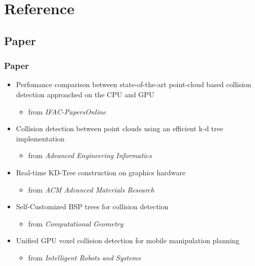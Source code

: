 \documentclass{beamer}
\begin{document}
\section{Reference}

\subsection{Paper}
	\begin{frame}
	\frametitle{Paper}
	\begin{itemize}
		\item Perfomance comparison between state-of-the-art point-cloud based collision detection approached on the CPU and GPU
			\begin{itemize}
				\item from \it{IFAC-PapersOnline}
			\end{itemize}
		\item Collision detection between point clouds using an efficient k-d tree implementation
			\begin{itemize}
				\item from \it{Advanced Engineering Informatics}
			\end{itemize}
		\item Real-time KD-Tree construction on graphics hardware
			\begin{itemize}
				\item from \it{ACM Advanced Materials Research}
			\end{itemize}
		\item Self-Customized BSP trees for collision detection
			\begin{itemize}
				\item from \it{Computational Geometry}
			\end{itemize}
		\item Unified GPU voxel collision detection for mobile manipulation planning
			\begin{itemize}
				\item from \it{Intelligent Robots and Systems}
			\end{itemize}
	\end{itemize}
	\end{frame}

\end{document}
